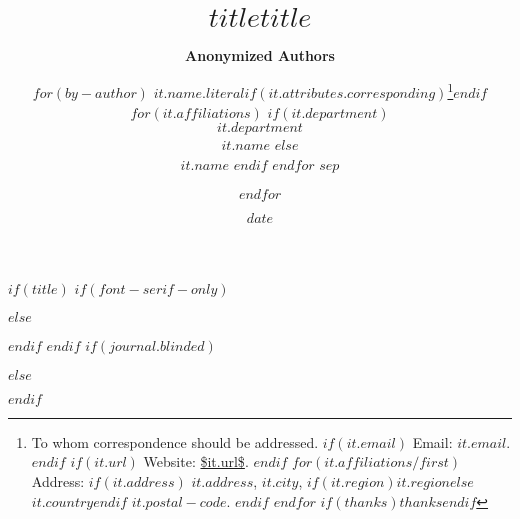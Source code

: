 $if(title)$
$if(font-serif-only)$
\title{\bfseries\huge $title$}
$else$
\title{\sffamily\bfseries\huge $title$}
$endif$
$endif$
$if(journal.blinded)$
\author{\textbf{Anonymized Authors}}
$else$
\author{$for(by-author)$
\textbf{$it.name.literal$}$if(it.attributes.corresponding)$\footnote{
To whom correspondence should be addressed.
$if(it.email)$
Email: \texttt{\href{mailto:$it.email$}{$it.email$}}.
$endif$
$if(it.url)$
Website: \url{$it.url$}.
$endif$
$for(it.affiliations/first)$
Address:
$if(it.address)$
$it.address$, $it.city$, $if(it.region)$$it.region$$else$$it.country$$endif$ $it.postal-code$.
$endif$
$endfor$
$if(thanks)$$thanks$$endif$}$endif$
$for(it.affiliations)$
$if(it.department)$
\\$it.department$\\$it.name$
$else$
\\$it.name$
$endif$
\vspace{0.05in}
$endfor$ $sep$
\and $endfor$}
$endif$
\date{$date$}